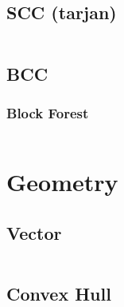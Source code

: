 \documentclass[a4paper, 11pt]{article}   	%
\begin{document}
\subsection{SCC (tarjan)}

\inputminted[breaklines, linenos]{cpp}{graph/scc.cpp}

\subsection{BCC}

\subsubsection{Block Forest}

\inputminted[breaklines, linenos]{cpp}{graph/bf.cpp}

\section{Geometry}

\subsection{Vector}

\inputminted[breaklines, linenos]{cpp}{geo/vec.cpp}

\subsection{Convex Hull}

\inputminted[breaklines, linenos]{cpp}{geo/hull.cpp}
\end{document}
